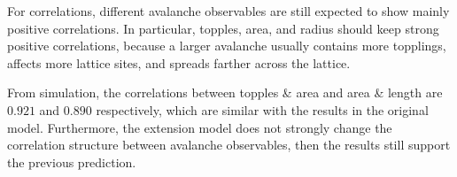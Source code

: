For correlations, different avalanche observables are still expected to show mainly positive correlations. In particular, topples, area, and radius should keep strong positive correlations, because a larger avalanche usually contains more topplings, affects more lattice sites, and spreads farther across the lattice. 

From simulation, the correlations between topples \& area and area \& length are $0.921$ and $0.890$ respectively, which are similar with the results in the original model. Furthermore, the extension model does not strongly change the correlation structure between avalanche observables, then the results still support the previous prediction. 